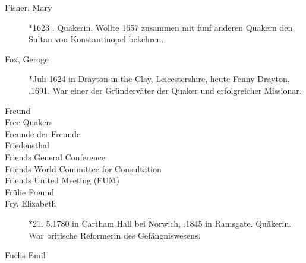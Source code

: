 \begin{description}
 \item[Fisher, Mary] $\ast$1623 . Quakerin. Wollte 1657 zusammen mit fünf anderen Quakern den Sultan von Konstantinopel bekehren.

 \item[Fox, Geroge] $\ast$Juli 1624 in Drayton-in-the-Clay, Leicestershire, heute Fenny Drayton, .1691. War einer der Gründerväter der Quaker und erfolgreicher Missionar.

 \item[Freund]

 \item[Free Quakers]
 
 \item[Freunde der Freunde]

 \item[Friedensthal]

 \item[Friends General Conference]

 \item[Friends World Committee for Consultation]

 \item[Friends United Meeting (FUM)]

 \item[Frühe Freund]

 \item[Fry, Elizabeth] $\ast$21. 5.1780 in Cartham Hall bei Norwich, .1845 in Ramsgate. Quäkerin. War britische Reformerin des Gefängniswesens.

 \item[Fuchs Emil]


 \end{description}

\normalsize
